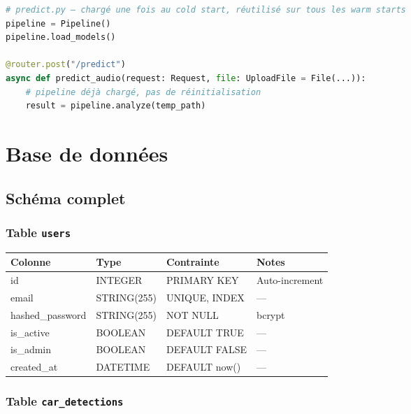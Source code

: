 \documentclass[11pt,a4paper]{article}
\begin{document}
\begin{lstlisting}[language=Python,caption={Optimisation 3 — Pipeline singleton module-level}]
# predict.py — chargé une fois au cold start, réutilisé sur tous les warm starts
pipeline = Pipeline()
pipeline.load_models()

@router.post("/predict")
async def predict_audio(request: Request, file: UploadFile = File(...)):
    # pipeline déjà chargé, pas de réinitialisation
    result = pipeline.analyze(temp_path)
\end{lstlisting}

\section{Base de données}

\subsection{Schéma complet}

\subsubsection{Table \texttt{users}}

\begin{table}[htbp]
\centering
\begin{tabular}{@{}llll@{}}
\toprule
\textbf{Colonne} & \textbf{Type} & \textbf{Contrainte} & \textbf{Notes} \\
\midrule
id & INTEGER & PRIMARY KEY & Auto-increment \\
email & STRING(255) & UNIQUE, INDEX & — \\
hashed\_password & STRING(255) & NOT NULL & bcrypt \\
is\_active & BOOLEAN & DEFAULT TRUE & — \\
is\_admin & BOOLEAN & DEFAULT FALSE & — \\
created\_at & DATETIME & DEFAULT now() & — \\
\bottomrule
\end{tabular}
\end{table}

\subsubsection{Table \texttt{car\_detections}}
\end{document}
